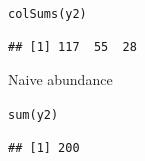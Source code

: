 \documentclass[color=usenames,dvipsnames]{beamer}\usepackage[]{graphicx}\usepackage[]{color}
\makeatletter
\newcommand{\hlstd}[1]{\textcolor[rgb]{0,0,0}{#1}}%
\newcommand{\hlkwd}[1]{\textcolor[rgb]{0.004,0.004,0.506}{#1}}%
\newenvironment{kframe}{%
 \def\at@end@of@kframe{}%
 \ifinner\ifhmode%
  \def\at@end@of@kframe{\end{minipage}}%
  \begin{minipage}{\columnwidth}%
 \fi\fi%
 \def\FrameCommand##1{\hskip\@totalleftmargin \hskip-\fboxsep
 \colorbox{shadecolor}{##1}\hskip-\fboxsep
     \hskip-\linewidth \hskip-\@totalleftmargin \hskip\columnwidth}%
 \MakeFramed {\advance\hsize-\width
   \@totalleftmargin\z@ \linewidth\hsize
   \@setminipage}}%
 {\par\unskip\endMakeFramed%
 \at@end@of@kframe}
\newenvironment{knitrout}{}{} %
\makeatother
\begin{document}
\begin{frame}[fragile]
\begin{columns}
\begin{column}{0.6\textwidth}
\begin{knitrout}\scriptsize
{}\color{fgcolor}\begin{kframe}
\begin{alltt}
\hlkwd{colSums}\hlstd{(y2)}
\end{alltt}
\begin{verbatim}
## [1] 117  55  28
\end{verbatim}
\end{kframe}
\end{knitrout}
  Naive abundance
  \vspace{-6pt}
\begin{knitrout}\scriptsize
{}\color{fgcolor}\begin{kframe}
\begin{alltt}
\hlkwd{sum}\hlstd{(y2)}
\end{alltt}
\begin{verbatim}
## [1] 200
\end{verbatim}
\end{kframe}
\end{knitrout}

  \end{column}
  \end{columns}
\end{frame}












\end{document}
